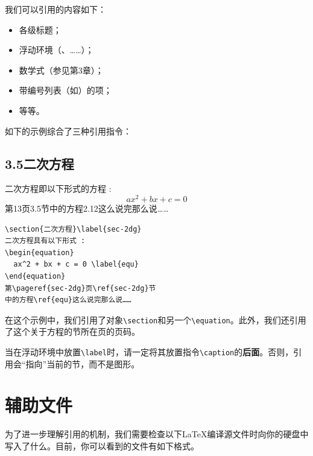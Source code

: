 我们可以引用的内容如下：

\begin{itemize}
  \item 各级标题；
  \item 浮动环境（、……）；
  \item 数学式（参见第3章）；
  \item 带编号列表（如）的项；
  \item 等等。
\end{itemize}

如下的示例综合了三种引用指令：

\begin{codelist}[2.21]{
  \section*{3.5\quad 二次方程}
二次方程即以下形式的方程 :
\begin{equation}
  ax^2 + bx + c = 0 \tag{2.12}
\end{equation}
第13页3.5节中的方程2.12这么说完那么说……
}
\begin{verbatim}
\section{二次方程}\label{sec-2dg}
二次方程具有以下形式 :
\begin{equation}
  ax^2 + bx + c = 0 \label{equ}
\end{equation}
第\pageref{sec-2dg}页\ref{sec-2dg}节
中的方程\ref{equ}这么说完那么说……\end{verbatim}
\end{codelist}

在这个示例中，我们引用了对象\verb|\section|和另一个\verb|\equation|。此外，我们还引用了这个关于方程的节所在页的页码。

\begin{exclamation}
当在浮动环境中放置\verb|\label|时，请一定将其放置指令\verb|\caption|的\textbf{后面}。否则，引用会“指向”当前的节，而不是图形。
\end{exclamation}

\section{辅助文件}

为了进一步理解引用的机制，我们需要检查以下\LaTeX 编译源文件时向你的硬盘中写入了什么。目前，你可以看到的文件有如下格式。

